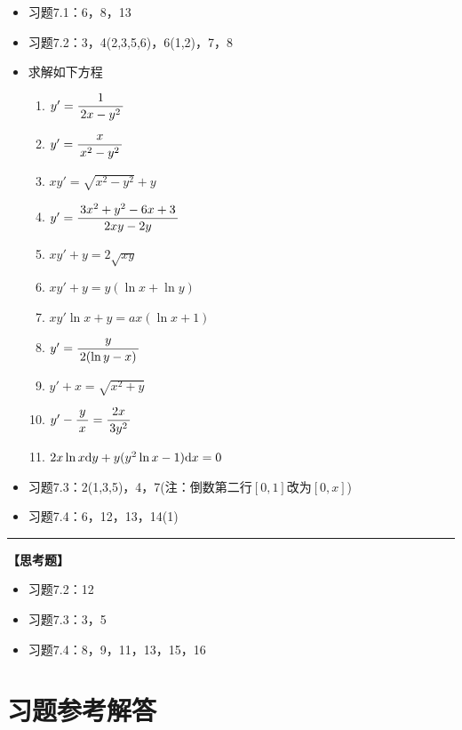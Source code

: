 \begin{itemize}
  \setlength{\itemindent}{1cm}
  \item 习题7.1：6，8，13
  \item 习题7.2：3，4(2,3,5,6)，6(1,2)，7，8
  \item 求解如下方程
	\begin{enumerate}[(1)]
	  \setlength{\itemindent}{1cm}
	  \item $y'=\displaystyle\frac{\,{1}\,}{\,{2x-y^2}\,}$
	  \item $y'=\displaystyle\frac{\,{x}\,}{\,{x^2-y^2}\,}$
	  \item $xy'=\sqrt{x^2-y^2}+y$
	  \item $y'=\displaystyle\frac{\,{3x^2+y^2-6x+3}\,}{\,{2xy-2y}\,}$
	  \item $xy'+y=2\sqrt{xy}$
	  \item $xy'+y=y(\ln x+\ln y) $
	  \item $xy'\ln x+y=ax(\ln x+1)$
	  \item $y'=\displaystyle\frac{\,{y}\,}{\,{2(\ln y-x)}\,}$
	  \item $y'+x=\sqrt{x^2+y}$
	  \item $y'-\displaystyle\frac{\,{y}\,}{\,{x}\,}=\displaystyle\frac{\,{2x}\,}{\,{3y^2}\,}$
	  \item $2x\ln x\mathrm{d} y+y(y^2\ln x-1)\mathrm{d} x=0$
	\end{enumerate}
  \item 习题7.3：2(1,3,5)，4，7(注：倒数第二行$[0,1]$改为$[0,x]$)
  \item 习题7.4：6，12，13，14(1)
  
\end{itemize}

\bigskip

\hrule

\bigskip
\bigskip

{\bf 【思考题】}

\begin{itemize}
  \setlength{\itemindent}{1cm}
  \item 习题7.2：12
  \item 习题7.3：3，5
  \item 习题7.4：8，9，11，13，15，16
\end{itemize}

\newpage

\section*{习题参考解答}


